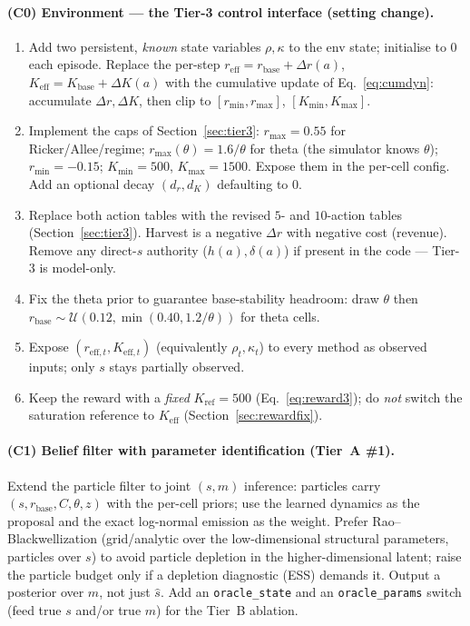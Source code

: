\documentclass[11pt]{article}
\newcommand{\reff}{r_{\mathrm{eff}}}
\newcommand{\Keff}{K_{\mathrm{eff}}}
\newcommand{\rbase}{r_{\mathrm{base}}}
\newcommand{\Kbase}{K_{\mathrm{base}}}
\newcommand{\Kref}{K_{\mathrm{ref}}}
\newcommand{\rmax}{r_{\max}}
\newcommand{\rmin}{r_{\min}}
\newcommand{\Kmax}{K_{\max}}
\newcommand{\Kmin}{K_{\min}}
\begin{document}
\paragraph{(C0) Environment --- the Tier-3 control interface (setting change).}
\begin{enumerate}[leftmargin=1.8em,nosep]
\item Add two persistent, \emph{known} state variables $\rho,\kappa$ to the env
state; initialise to $0$ each episode. Replace the per-step $\reff=\rbase+\Delta
r(a)$, $\Keff=\Kbase+\Delta K(a)$ with the cumulative update of
Eq.~\eqref{eq:cumdyn}: accumulate $\Delta r,\Delta K$, then clip to
$[\rmin,\rmax]$, $[\Kmin,\Kmax]$.
\item Implement the caps of Section~\ref{sec:tier3}: $\rmax{=}0.55$ for
Ricker/Allee/regime; $\rmax(\theta){=}1.6/\theta$ for theta (the simulator knows
$\theta$); $\rmin{=}-0.15$; $\Kmin{=}500$, $\Kmax{=}1500$. Expose them in the
per-cell config. Add an optional decay $(d_r,d_K)$ defaulting to $0$.
\item Replace both action tables with the revised $5$- and $10$-action tables
(Section~\ref{sec:tier3}). Harvest is a negative $\Delta r$ with negative cost
(revenue). Remove any direct-$s$ authority ($h(a),\delta(a)$) if present in the
code --- Tier-3 is model-only.
\item Fix the theta prior to guarantee base-stability headroom: draw $\theta$ then
$\rbase\sim\mathcal{U}(0.12,\min(0.40,1.2/\theta))$ for theta cells.
\item Expose $(r_{\mathrm{eff},t},K_{\mathrm{eff},t})$ (equivalently $\rho_t,\kappa_t$) to every
method as observed inputs; only $s$ stays partially observed.
\item Keep the reward with a \emph{fixed} $\Kref{=}500$ (Eq.~\eqref{eq:reward3});
do \emph{not} switch the saturation reference to $\Keff$ (Section~\ref{sec:rewardfix}).
\end{enumerate}

\paragraph{(C1) Belief filter with parameter identification (Tier~A \#1).}
Extend the particle filter to joint $(s,m)$ inference: particles carry
$(s,\rbase,C,\theta,z)$ with the per-cell priors; use the learned dynamics as the
proposal and the exact log-normal emission as the weight. Prefer Rao--Blackwellization
(grid/analytic over the low-dimensional structural parameters, particles over $s$)
to avoid particle depletion in the higher-dimensional latent; raise the particle
budget only if a depletion diagnostic (ESS) demands it. Output a posterior over
$m$, not just $\hat s$. Add an \texttt{oracle\_state} and an \texttt{oracle\_params}
switch (feed true $s$ and/or true $m$) for the Tier~B ablation.
\end{document}
